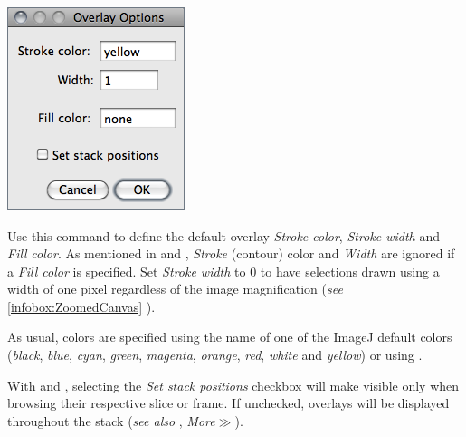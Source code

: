 

\subsubsection[\protect\userinterface{Overlay Options\ldots{}}]{\protect{}\label{sub:Overlay-Options...}}

\begin{minipage}[c][1\totalheight][t]{0.297\columnwidth}%
\includegraphics[scale=0.55]{images/OverlayOptions}%
\end{minipage}%
\begin{minipage}[c][1\totalheight][t]{0.703\columnwidth}%
Use this command to define the default overlay\emph{
Stroke color},\emph{ Stroke width} and \emph{Fill} \emph{color}. As
mentioned in 
and ,
\emph{Stroke} (contour) color and \emph{Width} are ignored if a \emph{Fill
color} is specified. Set \emph{Stroke width} to 0 to have selections
drawn using a width of one pixel regardless of the image magnification
(\emph{see} \ref{infobox:ZoomedCanvas} ).
\medskip{}


As usual, colors are specified using the name of one of the ImageJ
default colors (\emph{black}, \emph{blue}, \emph{cyan}, \emph{green},
\emph{magenta}, \emph{orange},\emph{ red}, \emph{white} and \emph{yellow})
or using .%
\end{minipage}

With  and ,
selecting the \emph{Set stack positions} checkbox will make 
visible only when browsing their respective slice or frame. If unchecked,
overlays will be displayed throughout the stack (\emph{see also} ,
\emph{More}{\scriptsize $\gg$}\emph{}).


